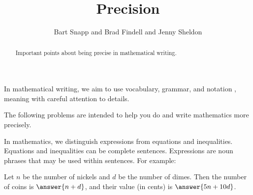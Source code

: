 \documentclass[nooutcomes]{ximera}
\title{Precision}
\author{Bart Snapp and Brad Findell and Jenny Sheldon}
\begin{document}
\begin{abstract}
Important points about being precise in mathematical writing.
\end{abstract}
\maketitle


%


%
%
%
%
%
%
%
%
%

\begin{problem}
In mathematical writing, we aim to use vocabulary, grammar, and notation , meaning with careful attention to details.  

The following problems are intended to help you do and write mathematics more precisely.  
\end{problem}


\begin{problem}
In mathematics, we distinguish expressions from equations and inequalities.  Equations and inequalities can be complete sentences.  Expressions are noun phrases that may be used within sentences.  For example: 

Let $n$ be the number of nickels and $d$ be the number of dimes.  Then the number of coins is $\answer{n+d}$, and their value (in cents) is $\answer{5n+10d}$.  
\end{problem}
\end{document}
